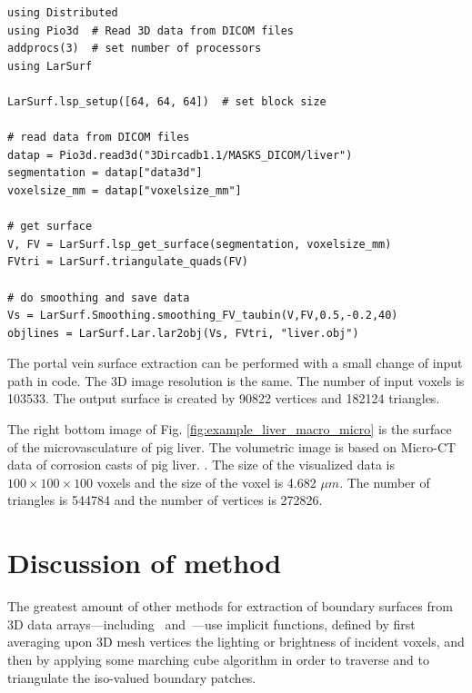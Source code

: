 \begin{lstlisting}[caption={Get surface from DICOM volumetric data}, label={lst:example1}]
using Distributed
using Pio3d  # Read 3D data from DICOM files
addprocs(3)  # set number of processors
using LarSurf

LarSurf.lsp_setup([64, 64, 64])  # set block size

# read data from DICOM files
datap = Pio3d.read3d("3Dircadb1.1/MASKS_DICOM/liver")
segmentation = datap["data3d"]
voxelsize_mm = datap["voxelsize_mm"]

# get surface
V, FV = LarSurf.lsp_get_surface(segmentation, voxelsize_mm)
FVtri = LarSurf.triangulate_quads(FV)

# do smoothing and save data
Vs = LarSurf.Smoothing.smoothing_FV_taubin(V,FV,0.5,-0.2,40)
objlines = LarSurf.Lar.lar2obj(Vs, FVtri, "liver.obj")
\end{lstlisting}

The portal vein surface extraction can be performed with a small change of input path in code.
The 3D image resolution is the same. 
The number of input voxels is 103533. 
The output surface is created by 90822 vertices and 182124 triangles. 

The right bottom image of Fig. \ref{fig:example_liver_macro_micro} is the surface of the microvasculature of pig liver. 
The volumetric image is based on Micro-CT data of corrosion casts of pig liver.
\cite{eberlova2017use}.
The size of the visualized data is $100\times100\times100$ voxels and the size of the voxel is 4.682 $\mu{}m$.
The number of triangles is 
544784 and the number of vertices is 272826.





\section{Discussion of method}\label{sec:discussion}

The greatest amount of other methods for extraction of boundary surfaces from 3D data arrays---including~\cite{10.1016/j.cad.2006.09.003} and~\cite{10.1115/1.2960489}---use implicit functions, defined by first averaging upon 3D mesh vertices the lighting or brightness of incident voxels, and then by applying some marching cube algorithm in order to traverse and to triangulate  the iso-valued boundary patches.  

